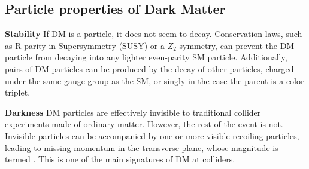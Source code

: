 \begin{textbox}[!h]
\section{Particle properties of Dark Matter}


\textbf{Stability}
If DM is a particle, it does not seem to decay.
Conservation laws, such as R-parity in Supersymmetry (SUSY) or a $Z_2$ symmetry, can prevent the DM particle from decaying into any lighter even-parity SM particle.
Additionally, pairs of DM particles can be produced by the decay of other particles, charged under the same gauge group as the SM, or singly in the case the parent is a color triplet. 

\textbf{Darkness} 
DM particles are effectively invisible to traditional collider experiments made of ordinary matter. However, the rest of the event is not. 
Invisible particles can be accompanied by one or more visible recoiling particles, leading to missing momentum in the transverse plane, whose magnitude is termed \MET. This is one of the main signatures of DM at colliders.

\end{textbox}
